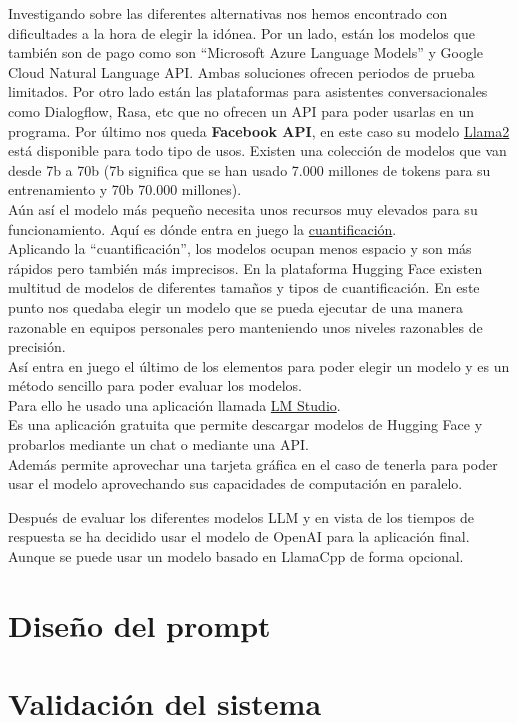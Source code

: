 Investigando sobre las diferentes alternativas nos hemos encontrado con 
dificultades a la hora de elegir la idónea.
Por un lado, están los modelos que también son de pago como son ``Microsoft Azure Language Models'' 
y Google Cloud Natural Language API. Ambas soluciones ofrecen periodos de prueba limitados.
Por otro lado están las plataformas para asistentes conversacionales como Dialogflow, Rasa, etc 
que no ofrecen un API para poder usarlas en un programa.
Por último nos queda \textbf{Facebook API}, en este caso su modelo 
\href{https://github.com/facebookresearch/llama}{Llama2} está disponible para todo tipo de usos.
Existen una colección de modelos que van desde 7b a 70b (7b significa que se han usado 
7.000 millones de tokens para su entrenamiento y 70b 70.000 millones).\\
Aún así el modelo más pequeño necesita unos recursos muy elevados para su funcionamiento. 
Aquí es dónde entra en juego la \href{https://es.wikipedia.org/wiki/Cuantificaci%C3%B3n_digital}{cuantificación}.\\
Aplicando la ``cuantificación'', los modelos ocupan menos espacio y son más rápidos pero también más imprecisos.
En la plataforma Hugging Face existen multitud de modelos de diferentes tamaños y tipos de cuantificación.
En este punto nos quedaba elegir un modelo que se pueda ejecutar de una manera razonable 
en equipos personales pero manteniendo unos niveles razonables de precisión.\\
Así entra en juego el último de los elementos para poder elegir un modelo y 
es un método sencillo para poder evaluar los modelos.\\
Para ello he usado una aplicación llamada \href{https://lmstudio.ai/}{LM Studio}.\\ 
Es una aplicación gratuita que permite descargar modelos de Hugging Face y 
probarlos mediante un chat o mediante una API.\\
Además permite aprovechar una tarjeta gráfica en el caso de tenerla 
para poder usar el modelo aprovechando sus capacidades de computación en paralelo.

Después de evaluar los diferentes modelos LLM y en vista de los tiempos de respuesta se ha decidido usar el modelo 
de OpenAI para la aplicación final. Aunque se puede usar un modelo basado en LlamaCpp de forma opcional.

\section{Diseño del prompt}


\section{Validación del sistema}


